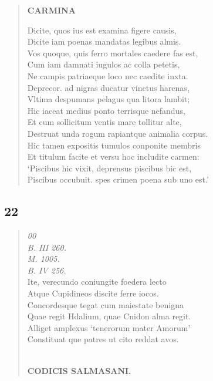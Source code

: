 \documentclass[11pt, a4paper]{report}
\begin{document}
\begin{verse}
    \begin{center} \textbf{CARMINA} \end{center} \marginpar{[96]} Dicite, quos ius est examina figere causis, \\ Dicite iam poenas mandatas legibus almis. \\ Vos quoque, quis ferro mortales caedere fas est, \\ Cum iam damnati iugulos ac colla petetis, \\ Ne campis patriaeque loco nec caedite inxta. \\ Deprecor. ad nigras ducatur vinctus harenas, \\ Vltima despumans pelagus qua litora lambit; \\ Hic iaceat medius ponto terrisque nefandus, \\ Et cum sollicitum ventis mare tollitur alte, \\ Destruat unda rogum rapiantque animalia corpus. \\ Hic tamen expositis tumulos conponite membris \\ Et titulum facite et versu hoc includite carmen: \\ ‘Piscibus hic vixit, deprensus piscibus bic est, \\ Piscibus occubuit. spes crimen poena sub uno est.’ \\ 
      \end{verse}
  
            \subsection*{22}
      \begin{verse}
      \textit{00} \\ \textit{B. III 260.} \\ \textit{M. 1005.} \\ \textit{B. IV 256.} \\ Ite, verecundo coniungite foedera lecto \\ Atque Cupidineos discite ferre iocos. \\ Concordesque tegat cum maiestate benigna \\ Quae regit Hdalium, quae Cnidon alma regit. \\ Alliget amplexus ‘tenerorum mater Amorum’ \\ Constituat \lbrack que \rbrack  patres ut cito reddat avos. \\ 
        ﻿\pagebreak 
    \begin{center} \textbf{CODICIS SALMASANI.} \end{center} \marginpar{[97]} 
      \end{verse}
  
\end{document}
